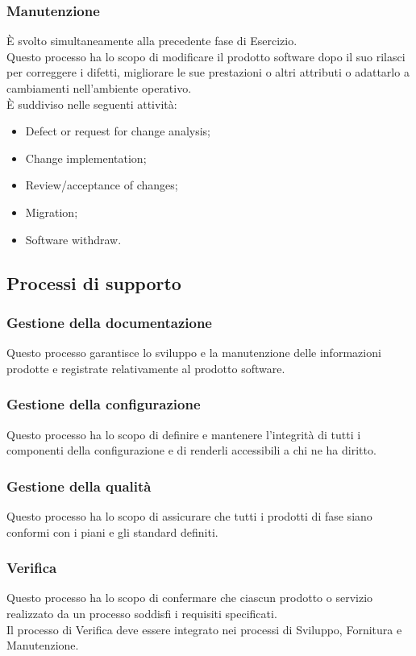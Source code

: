 \subsubsection{Manutenzione}
È svolto simultaneamente alla precedente fase di Esercizio.\\
Questo processo ha lo scopo di modificare il prodotto software dopo il suo rilasci per correggere i difetti, migliorare le sue prestazioni o altri attributi o adattarlo a cambiamenti nell'ambiente operativo.\\
È suddiviso nelle seguenti attività:
\begin{itemize}
  \item Defect or request for change analysis;
  \item Change implementation;
  \item Review/acceptance of changes;
  \item Migration;
  \item Software withdraw.
\end{itemize}

\vspace{2cm}

\subsection{Processi di supporto} \label{subsection:processi_supporto}
\subsubsection{Gestione della documentazione}
Questo processo garantisce lo sviluppo e la manutenzione delle informazioni prodotte e registrate relativamente al prodotto software. 

\subsubsection{Gestione della configurazione}
Questo processo ha lo scopo di definire e mantenere l'integrità di tutti i componenti della configurazione e di renderli accessibili a chi ne ha diritto.

\subsubsection{Gestione della qualità}
Questo processo ha lo scopo di assicurare che tutti i prodotti di fase siano conformi con i piani e gli standard definiti.

\subsubsection{Verifica}
Questo processo ha lo scopo di confermare che ciascun prodotto o servizio realizzato da un processo soddisfi i requisiti specificati.\\
Il processo di Verifica deve essere integrato nei processi di Sviluppo, Fornitura e Manutenzione.

